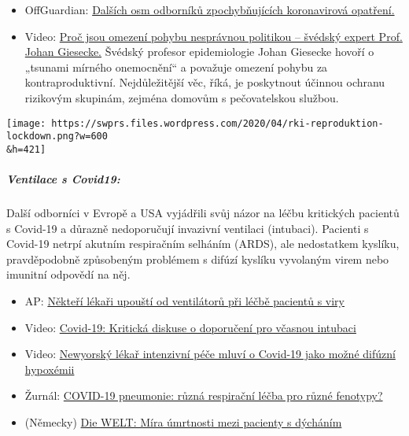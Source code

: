 \begin{itemize}
{  případů korony? Jen testujte méně!``} Denní počet„ nových případů
  ``uvádí málo o stavu epidemie. Vyvolávání strachu pomocí křivky
  kumulativních úmrtí s pozitivním testem bylo bezohledné, tvrdí.
\item
  OffGuardian:
  \href{https://off-guardian.org/2020/04/17/8-more-experts-questioning-the-coronavirus-panic/}{Dalších
  osm odborníků zpochybňujících koronavirová opatření.}
\item
  Video: \href{https://www.youtube.com/watch?v=bfN2JWifLCY}{Proč jsou
  omezení pohybu nesprávnou politikou -- švédský expert Prof. Johan
  Giesecke.} Švédský profesor epidemiologie Johan Giesecke hovoří o
  „tsunami mírného onemocnění`` a považuje omezení pohybu za
  kontraproduktivní. Nejdůležitější věc, říká, je poskytnout účinnou
  ochranu rizikovým skupinám, zejména domovům s pečovatelskou službou.
\end{itemize}

\texttt{[image: https://swprs.files.wordpress.com/2020/04/rki-reproduktion-lockdown.png?w=600\\\&h=421]}

\hypertarget{ventilace-s-covid19}{%
\subparagraph{\texorpdfstring{\textbf{Ventilace s
Covid19:}}{Ventilace s Covid19:}}\label{ventilace-s-covid19}}

Další odborníci v Evropě a USA vyjádřili svůj názor na léčbu kritických
pacientů s Covid-19 a důrazně nedoporučují invazivní ventilaci
(intubaci). Pacienti s Covid-19 netrpí akutním respiračním selháním
(ARDS), ale nedostatkem kyslíku, pravděpodobně způsobeným problémem s
difúzí kyslíku vyvolaným virem nebo imunitní odpovědí na něj.

\begin{itemize}
\tightlist
\item
  AP: \href{https://apnews.com/8ccd325c2be9bf454c2128dcb7bd616d}{Někteří
  lékaři upouští od ventilátorů při léčbě pacientů s viry} 
\item
  Video: \href{https://www.youtube.com/watch?v=QPlEUAVjxV8}{Covid-19:
  Kritická diskuse o doporučení pro včasnou intubaci}
\item
  Video: \href{https://www.youtube.com/watch?v=NmRlvX3VrAQ}{Newyorský
  lékař intenzivní péče mluví o Covid-19 jako možné difúzní hypoxémii}
\item
  Žurnál:
  \href{https://link.springer.com/article/10.1007/s00134-020-06033-2}{COVID-19
  pneumonie: různá respirační léčba pro různé fenotypy?}
\item
  (Německy)
  \href{https://www.welt.de/vermischtes/article207221877/Corona-Pandemie-Sterberate-bei-Beatmungspatienten-gibt-Raetsel-auf.html}{Die
  WELT: Míra úmrtnosti mezi pacienty s dýcháním}
\end{itemize}

